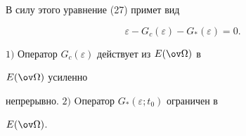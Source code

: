 В силу этого уравнение (27) примет вид 


\begin{equation} 


\varepsilon-G_c(\varepsilon)-G_*(\varepsilon)=0. 


\end{equation} 





 


\begin{thm} 


$1)$ Оператор $G_c(\varepsilon)$ действует из $E(\ov\Omega)$ в 


$E(\ov\Omega)$ усиленно 


непрерывно. $2)$ Oператор $G_*(\varepsilon;t_0)$ ограничен в 


$E(\ov\Omega)$. 


\end{thm} 


 


 


